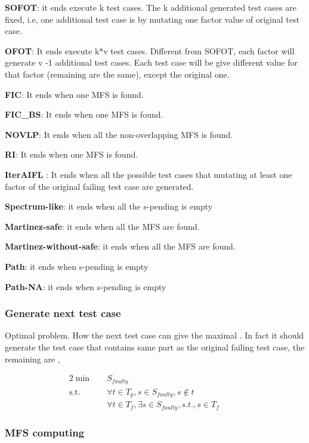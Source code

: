 \documentclass[10pt,journal,cspaper,compsoc]{IEEEtran}
\begin{document}
\textbf{SOFOT}: it ends execute k test cases. The k additional generated test cases are fixed, i.e, one additional test case is by mutating one factor value of original test case.

\textbf{OFOT}: It ends execute k*v test cases. Different from SOFOT, each factor will   generate v -1 additional test cases. Each test case will be give different value for that factor (remaining are the same), except the original one.

\textbf{FIC}: It ends when one MFS is found.

\textbf{FIC\_BS}: It ends when one MFS is found.

\textbf{NOVLP}: It ends when all the non-overlapping MFS is found.

\textbf{RI}: It ends when one MFS is found.

\textbf{IterAIFL} : It ends when all the possible test cases that mutating at least one factor of the original failing test case  are generated. 

\textbf{Spectrum-like}: it ends when all the s-pending is empty

\textbf{Martinez-safe}: it ends when all the MFS are found.

\textbf{Martinez-without-safe}: it ends when all the MFS are found.

\textbf{Path}: it ends when s-pending is empty

\textbf{Path-NA}: it ends when s-pending is empty




\subsubsection{Generate next test case}

Optimal problem. How the next test case can give the maximal . In fact it should generate the test case that contains same part as the original failing test case, the remaining are ,

\begin{alignat}{2}
\min\quad &  S_{faulty} &{}& \tag{EQ8} \label{eq-optimal-testcase}\\
\mbox{s.t.}\quad
& \forall t \in T_{p}, s \in S_{faulty}, s \not\in t &\quad& {}\nonumber \\
& \forall t \in T_{f}, \exists s \in S_{faulty}, s.t., s \in T_{f} &\quad& {}\nonumber
\end{alignat}


\subsubsection{MFS computing}
\end{document}
